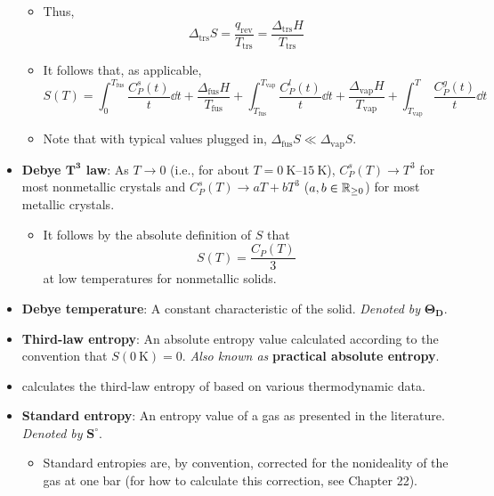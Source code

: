 \documentclass[../notes.tex]{subfiles}
\begin{document}
\begin{itemize}
\begin{itemize}
        \item Thus,
        \begin{equation*}
            \Delta_\text{trs}S = \frac{q_\text{rev}}{T_\text{trs}}
            = \frac{\Delta_\text{trs}H}{T_\text{trs}}
        \end{equation*}
        \item It follows that, as applicable,
        \begin{equation*}
            S(T) = \int_0^{T_\text{fus}}\frac{C_P^s(t)}{t}\dd{t}+\frac{\Delta_\text{fus}H}{T_\text{fus}}+\int_{T_\text{fus}}^{T_\text{vap}}\frac{C_P^l(t)}{t}\dd{t}+\frac{\Delta_\text{vap}H}{T_\text{vap}}+\int_{T_\text{vap}}^T\frac{C_P^g(t)}{t}\dd{t}
        \end{equation*}
        \item Note that with typical values plugged in, $\Delta_\text{fus}S\ll\Delta_\text{vap}S$.
    \end{itemize}
    \item \textbf{Debye $\bm{T^3}$ law}: As $T\to 0$ (i.e., for about $T=\SIrange{0}{15}{\kelvin}$), $C_P^s(T)\to T^3$ for most nonmetallic crystals and $C_P^s(T)\to aT+bT^3$ ($a,b\in\mathbb{R}_{\geq 0}$) for most metallic crystals.
    \begin{itemize}
        \item It follows by the absolute definition of $S$ that
        \begin{equation*}
            S(T) = \frac{C_P(T)}{3}
        \end{equation*}
        at low temperatures for nonmetallic solids.
    \end{itemize}
    \item \textbf{Debye temperature}: A constant characteristic of the solid. \emph{Denoted by} $\bm{\Theta_\textbf{D}}$.
    \item \textbf{Third-law entropy}: An absolute entropy value calculated according to the convention that $S(\SI{0}{\kelvin})=0$. \emph{Also known as} \textbf{practical absolute entropy}.
    \item \textcite{bib:McQuarrieSimon} calculates the third-law entropy of  based on various thermodynamic data.
    \item \textbf{Standard entropy}: An entropy value of a gas as presented in the literature. \emph{Denoted by} $\bm{S^\circ}$.
    \begin{itemize}
        \item Standard entropies are, by convention, corrected for the nonideality of the gas at one bar (for how to calculate this correction, see Chapter 22).

\end{itemize}
\end{itemize}
\end{document}
